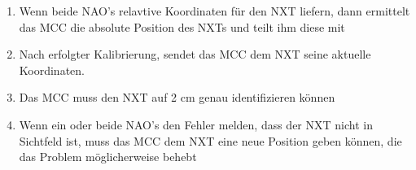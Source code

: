 \begin{enumerate}
\begin{enumerate}
\begin{enumerate}
            \item Wenn beide NAO's relavtive Koordinaten für den NXT liefern, dann ermittelt das MCC die absolute Position des NXTs und teilt ihm diese mit

            \item Nach erfolgter Kalibrierung, sendet das MCC dem NXT seine aktuelle Koordinaten.

            \item Das MCC muss den NXT auf 2 cm genau identifizieren können
            
            \item Wenn ein oder beide NAO's den Fehler melden, dass der NXT nicht in Sichtfeld ist, muss das MCC dem NXT eine neue Position geben können, die das Problem möglicherweise behebt
        \end{enumerate}
    \end{enumerate}    
\end{enumerate}
    
